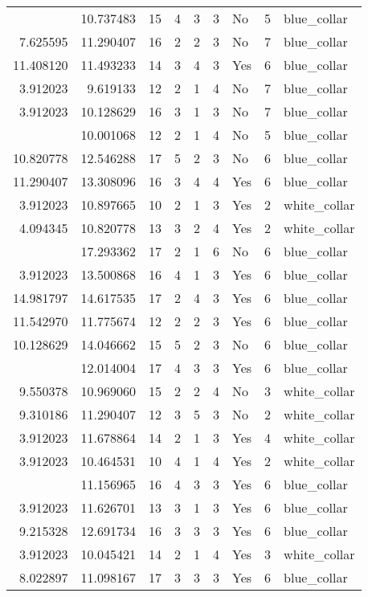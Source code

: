\documentclass[
]{article}
\begin{document}
\begin{longtable}[t]{rrrrrllrl}
\addlinespace
9.954656 & 10.737483 & 15 & 4 & 3 & 3 & No & 5 & blue\_collar\\
7.625595 & 11.290407 & 16 & 2 & 2 & 3 & No & 7 & blue\_collar\\
11.408120 & 11.493233 & 14 & 3 & 4 & 3 & Yes & 6 & blue\_collar\\
3.912023 & 9.619133 & 12 & 2 & 1 & 4 & No & 7 & blue\_collar\\
3.912023 & 10.128629 & 16 & 3 & 1 & 3 & No & 7 & blue\_collar\\
\addlinespace
3.912023 & 10.001068 & 12 & 2 & 1 & 4 & No & 5 & blue\_collar\\
10.820778 & 12.546288 & 17 & 5 & 2 & 3 & No & 6 & blue\_collar\\
11.290407 & 13.308096 & 16 & 3 & 4 & 4 & Yes & 6 & blue\_collar\\
3.912023 & 10.897665 & 10 & 2 & 1 & 3 & Yes & 2 & white\_collar\\
4.094345 & 10.820778 & 13 & 3 & 2 & 4 & Yes & 2 & white\_collar\\
\addlinespace
3.912023 & 17.293362 & 17 & 2 & 1 & 6 & No & 6 & blue\_collar\\
3.912023 & 13.500868 & 16 & 4 & 1 & 3 & Yes & 6 & blue\_collar\\
14.981797 & 14.617535 & 17 & 2 & 4 & 3 & Yes & 6 & blue\_collar\\
11.542970 & 11.775674 & 12 & 2 & 2 & 3 & Yes & 6 & blue\_collar\\
10.128629 & 14.046662 & 15 & 5 & 2 & 3 & No & 6 & blue\_collar\\
\addlinespace
9.310186 & 12.014004 & 17 & 4 & 3 & 3 & Yes & 6 & blue\_collar\\
9.550378 & 10.969060 & 15 & 2 & 2 & 4 & No & 3 & white\_collar\\
9.310186 & 11.290407 & 12 & 3 & 5 & 3 & No & 2 & white\_collar\\
3.912023 & 11.678864 & 14 & 2 & 1 & 3 & Yes & 4 & white\_collar\\
3.912023 & 10.464531 & 10 & 4 & 1 & 4 & Yes & 2 & white\_collar\\
\addlinespace
7.625595 & 11.156965 & 16 & 4 & 3 & 3 & Yes & 6 & blue\_collar\\
3.912023 & 11.626701 & 13 & 3 & 1 & 3 & Yes & 6 & blue\_collar\\
9.215328 & 12.691734 & 16 & 3 & 3 & 3 & Yes & 6 & blue\_collar\\
3.912023 & 10.045421 & 14 & 2 & 1 & 4 & Yes & 3 & white\_collar\\
8.022897 & 11.098167 & 17 & 3 & 3 & 3 & Yes & 6 & blue\_collar\\

\end{longtable}
\end{document}
